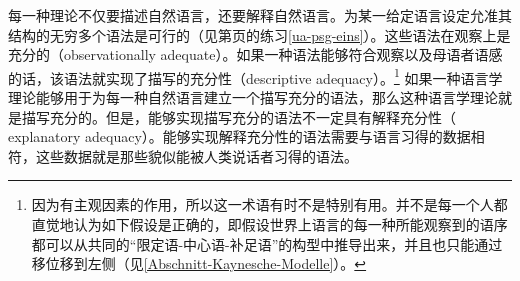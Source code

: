 每一种理论不仅要描述自然语言，还要解释自然语言。为某一给定语言设定允准其结构的无穷多个语法是可行的（见第\pageref{ua-psg-eins}页的练习\ref{ua-psg-eins}）。这些语法在观察上是充分的（observationally adequate）。如果一种语法能够符合观察以及母语者语感的话，该语法就实现了描写的充分性（descriptive adequacy）。\footnote{%
因为有主观因素的作用，所以这一术语有时不是特别有用。并不是每一个人都直觉地认为如下假设是正确的，即假设世界上语言的每一种所能观察到的语序都可以从共同的“限定语-中心语-补足语”的构型中推导出来，并且也只能通过移位移到左侧（见\ref{Abschnitt-Kaynesche-Modelle}）。
}
如果一种语言学理论能够用于为每一种自然语言建立一个描写充分的语法，那么这种语言学理论就是描写充分的。但是，能够实现描写充分的语法不一定具有解释充分性（ explanatory adequacy）。能够实现解释充分性的语法需要与语言习得的数据相符，这些数据就是那些貌似能被人类说话者习得的语法\citep[--25]{Chomsky65a}。

